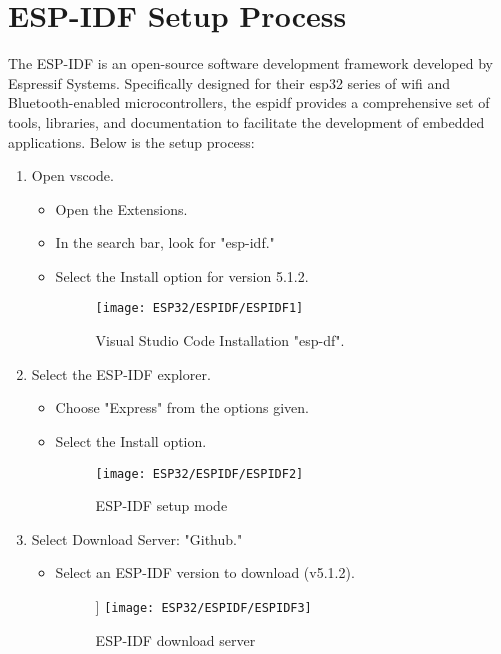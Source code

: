 \section{ESP-IDF Setup Process}

The ESP-IDF is an open-source software development framework developed by Espressif Systems. Specifically designed for their esp32 series of wifi and Bluetooth-enabled microcontrollers, the espidf provides a comprehensive set of tools, libraries, and documentation to facilitate the development of embedded applications. Below is the setup process:

\begin{enumerate}
    \item Open vscode.
    \begin{itemize}
        \item Open the Extensions.
        \item In the search bar, look for "esp-idf."
        \item Select the Install option for version 5.1.2.
        \begin{figure}[H]  
            \centering
            \texttt{[image: ESP32/ESPIDF/ESPIDF1]}
            \caption{Visual Studio Code Installation "esp-df".} 
        \end{figure}
    \end{itemize}
    
    \item Select the ESP-IDF explorer.
    \begin{itemize}
        \item Choose "Express" from the options given.
        \item Select the Install option.
        \begin{figure}[H]   
            \centering
            \texttt{[image: ESP32/ESPIDF/ESPIDF2]}
            \caption{ ESP-IDF setup mode} 
        \end{figure}
    \end{itemize}
    
    \item Select Download Server: "Github."
    \begin{itemize}
        \item Select an ESP-IDF version to download (v5.1.2).
        \begin{figure}[H]] 
            \centering
            \texttt{[image: ESP32/ESPIDF/ESPIDF3]}
            \caption{ ESP-IDF download server} 
        \end{figure}
    \end{itemize}
\end{enumerate}

